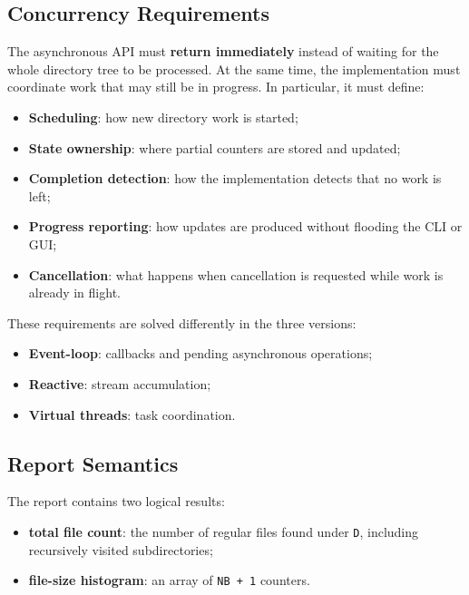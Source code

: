 \subsection{Concurrency Requirements}

The asynchronous API must \textbf{return immediately} instead of waiting for the whole directory tree to be processed.
At the same time, the implementation must coordinate work that may still be in progress.
In particular, it must define:

\begin{itemize}
  \item \textbf{Scheduling}: how new directory work is started;
  \item \textbf{State ownership}: where partial counters are stored and updated;
  \item \textbf{Completion detection}: how the implementation detects that no work is left;
  \item \textbf{Progress reporting}: how updates are produced without flooding the CLI or GUI;
  \item \textbf{Cancellation}: what happens when cancellation is requested while work is already in flight.
\end{itemize}

These requirements are solved differently in the three versions:

\begin{itemize}
  \item \textbf{Event-loop}: callbacks and pending asynchronous operations;
  \item \textbf{Reactive}: stream accumulation;
  \item \textbf{Virtual threads}: task coordination.
\end{itemize}

\subsection{Report Semantics}

The report contains two logical results:

\begin{itemize}
  \item \textbf{total file count}: the number of regular files found under \texttt{D}, including recursively visited subdirectories;
  \item \textbf{file-size histogram}: an array of \texttt{NB + 1} counters.
\end{itemize}

